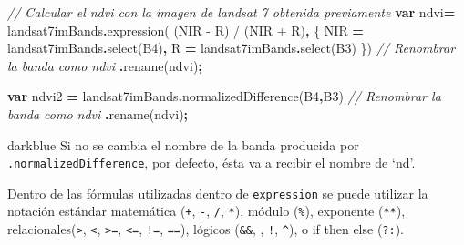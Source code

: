 \documentclass[
  12pt,
  letterpaper,
  twoside]{book}
\newenvironment{Shaded}{\begin{snugshade}}{\end{snugshade}}
\newcommand{\CommentTok}[1]{\textcolor[rgb]{0.56,0.35,0.01}{\textit{#1}}}
\newcommand{\FunctionTok}[1]{\textcolor[rgb]{0.00,0.00,0.00}{#1}}
\newcommand{\KeywordTok}[1]{\textcolor[rgb]{0.13,0.29,0.53}{\textbf{#1}}}
\newcommand{\NormalTok}[1]{#1}
\newcommand{\OperatorTok}[1]{\textcolor[rgb]{0.81,0.36,0.00}{\textbf{#1}}}
\newcommand{\StringTok}[1]{\textcolor[rgb]{0.31,0.60,0.02}{#1}}
\begin{document}
\begin{Shaded}
\begin{Highlighting}[]
\CommentTok{// Calcular el ndvi con la imagen de landsat 7 obtenida previamente}
\KeywordTok{var}\NormalTok{ ndvi}\OperatorTok{=}\NormalTok{ landsat7imBands}\OperatorTok{.}\FunctionTok{expression}\NormalTok{( }\StringTok{\textquotesingle{}(NIR {-} R) / (NIR + R)\textquotesingle{}}\OperatorTok{,}\NormalTok{ \{}
  \StringTok{\textquotesingle{}NIR\textquotesingle{}} \OperatorTok{=}\NormalTok{ landsat7imBands}\OperatorTok{.}\FunctionTok{select}\NormalTok{(}\StringTok{\textquotesingle{}B4\textquotesingle{}}\NormalTok{)}\OperatorTok{,}
  \StringTok{\textquotesingle{}R\textquotesingle{}} \OperatorTok{=}\NormalTok{ landsat7imBands}\OperatorTok{.}\FunctionTok{select}\NormalTok{(}\StringTok{\textquotesingle{}B3\textquotesingle{}}\NormalTok{)}
\NormalTok{\})}
  \CommentTok{// Renombrar la banda como \textquotesingle{}ndvi\textquotesingle{}}
  \OperatorTok{.}\FunctionTok{rename}\NormalTok{(}\StringTok{\textquotesingle{}ndvi\textquotesingle{}}\NormalTok{)}\OperatorTok{;}
  
\KeywordTok{var}\NormalTok{ ndvi2 }\OperatorTok{=}\NormalTok{ landsat7imBands}\OperatorTok{.}\FunctionTok{normalizedDifference}\NormalTok{(}\StringTok{\textquotesingle{}B4\textquotesingle{}}\OperatorTok{,}\StringTok{\textquotesingle{}B3\textquotesingle{}}\NormalTok{)}
  \CommentTok{// Renombrar la banda como \textquotesingle{}ndvi\textquotesingle{}}
  \OperatorTok{.}\FunctionTok{rename}\NormalTok{(}\StringTok{\textquotesingle{}ndvi\textquotesingle{}}\NormalTok{)}\OperatorTok{;}
\end{Highlighting}
\end{Shaded}

\begin{bluebox2}

\begin{awesomeblock}{5pt}{\faLightbulb}{darkblue}
Si no se cambia el nombre de la banda producida por \texttt{.normalizedDifference}, por defecto, ésta va a recibir el nombre de `nd'.

\end{awesomeblock}

\end{bluebox2}

Dentro de las fórmulas utilizadas dentro de \texttt{expression} se puede utilizar la notación estándar matemática (\texttt{+}, \texttt{-}, \texttt{/}, \texttt{*}), módulo (\texttt{\%}), exponente (\texttt{**}), relacionales(\texttt{\textgreater{}}, \texttt{\textless{}}, \texttt{\textgreater{}=}, \texttt{\textless{}=}, \texttt{!=}, \texttt{==}), lógicos (\texttt{\&\&}, \texttt{\textbar{}\textbar{}}, \texttt{!}, \texttt{\^{}}), o if then else (\texttt{?:}).
\end{document}
